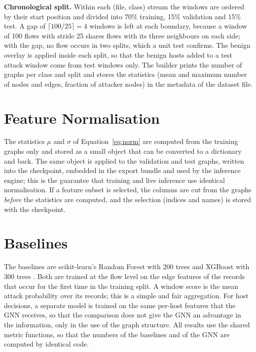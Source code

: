 \textbf{Chronological split.} Within each (file, class) stream the windows are ordered by their start position and divided into 70\% training, 15\% validation and 15\% test. A gap of $\lceil 100/25\rceil=4$ windows is left at each boundary, because a window of 100 flows with stride 25 shares flows with its three neighbours on each side; with the gap, no flow occurs in two splits, which a unit test confirms. The benign overlay is applied inside each split, so that the benign hosts added to a test attack window come from test windows only. The builder prints the number of graphs per class and split and stores the statistics (mean and maximum number of nodes and edges, fraction of attacker nodes) in the metadata of the dataset file.

\section{Feature Normalisation}
The statistics $\mu$ and $\sigma$ of Equation~\ref{eq:norm} are computed from the training graphs only and stored as a small object that can be converted to a dictionary and back. The same object is applied to the validation and test graphs, written into the checkpoint, embedded in the export bundle and used by the inference engine; this is the guarantee that training and live inference use identical normalisation. If a feature subset is selected, the columns are cut from the graphs \emph{before} the statistics are computed, and the selection (indices and names) is stored with the checkpoint.

\section{Baselines}
The baselines are scikit-learn's Random Forest with 200 trees \cite{bib:rf,bib:sklearn} and XGBoost with 300 trees \cite{bib:xgb}. Both are trained at the flow level on the edge features of the records that occur for the first time in the training split. A window score is the mean attack probability over its records; this is a simple and fair aggregation. For host decisions, a separate model is trained on the same per-host features that the GNN receives, so that the comparison does not give the GNN an advantage in the information, only in the use of the graph structure. All results use the shared metric functions, so that the numbers of the baselines and of the GNN are computed by identical code.

